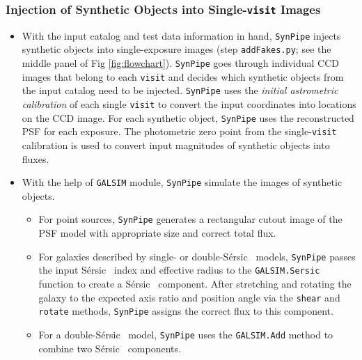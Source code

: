 \documentclass[useamsfonts]{pasj01}
\def\ser{{S\'{e}rsic\ }}
\def\synpipe{\texttt{SynPipe}}
\def\visit{\texttt{visit}}
\def\galsim{\texttt{G}{\scriptsize \texttt{AL}}\texttt{S}{\scriptsize \texttt{IM}}}
\begin{document}
\subsubsection{Injection of Synthetic Objects into Single-\visit{} Images}
    \label{sssec:addFakes}
    
    \begin{itemize}
    
        \item With the input catalog and test data information in hand, \synpipe{} 
            injects synthetic objects into single-exposure images (step
            \texttt{addFakes.py}; see the middle panel of Fig \ref{fig:flowchart}).
            \synpipe{} goes through individual CCD images that belong to 
            each \visit{} and decides which synthetic objects from the input catalog 
            need to be injected. 
            \synpipe{} uses the \textit{initial astrometric calibration} of each 
            single \visit{} to convert the input coordinates into locations on the 
            CCD image. 
            For each synthetic object, \synpipe{} uses the reconstructed PSF for each 
            exposure.  
            The photometric zero point from the single-\visit{} calibration is used
            to convert input magnitudes of synthetic objects into fluxes.
    
        \item With the help of \galsim{} module, \synpipe{} simulate the images of
            synthetic objects.
            \begin{itemize}
            
            \item For point sources, \synpipe{} generates a rectangular cutout image 
                of the PSF model with appropriate size and correct total flux. 
            
            \item For galaxies described by single- or double-\ser{} models, 
                \synpipe{} passes the input \ser{} index and effective radius to 
                the \galsim{}\texttt{.Sersic} function to create a \ser{} component.
                After stretching and rotating the galaxy to the expected axis ratio 
                and position angle via the \texttt{shear} and \texttt{rotate} methods,
                \synpipe{} assigns the correct flux to this component.
            
            \item For a double-\ser{} model, \synpipe{} uses the \galsim{}\texttt{.Add}
                method to combine two \ser{} components. 
            

\end{itemize}
\end{itemize}
\end{document}
